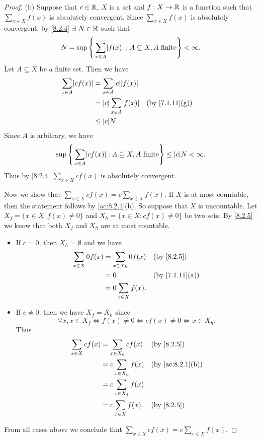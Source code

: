 \begin{proof}{(b)}
  Suppose that \(c \in \mathbb{R}\), \(X\) is a set and \(f : X \to \mathbb{R}\) is a function such that \(\sum_{x \in X} f(x)\) is absolutely convergent.
  Since \(\sum_{x \in X} f(x)\) is absolutely convergent, by \cref{8.2.4} \(\exists\ N \in \mathbb{R}\) such that
  \[
    N = \sup\Bigg\{\sum_{x \in A} \abs{f(x)} : A \subseteq X, A \text{ finite}\Bigg\} < \infty.
  \]
  Let \(A \subseteq X\) be a finite set.
  Then we have
  \begin{align*}
    \sum_{x \in A} \abs{cf(x)} & = \sum_{x \in A} \abs{c}\abs{f(x)}                                   \\
                               & = \abs{c}\sum_{x \in A} \abs{f(x)} &  & \text{(by \cref{7.1.11}(g))} \\
                               & \leq \abs{c} N.
  \end{align*}
  Since \(A\) is arbitrary, we have
  \[
    \sup\Bigg\{\sum_{x \in A} \abs{cf(x)} : A \subseteq X, A \text{ finite}\Bigg\} \leq \abs{c}N < \infty.
  \]
  Thus by \cref{8.2.4} \(\sum_{x \in X} cf(x)\) is absolutely convergent.

  Now we show that \(\sum_{x \in X} cf(x) = c \sum_{x \in X} f(x)\).
  If \(X\) is at most countable, then the statement follows by \cref{ac:8.2.1}(b).
  So suppose that \(X\) is uncountable.
  Let \(X_f = \{x \in X : f(x) \neq 0\}\) and \(X_h = \{x \in X : cf(x) \neq 0\}\) be two sets.
  By \cref{8.2.5} we know that both \(X_f\) and \(X_h\) are at most countable.
  \begin{itemize}
    \item If \(c = 0\), then \(X_h = \emptyset\) and we have
          \begin{align*}
            \sum_{x \in X} 0f(x) & = \sum_{x \in X_h} 0f(x) &  & \text{(by \cref{8.2.5})}     \\
                                 & = 0                      &  & \text{(by \cref{7.1.11}(a))} \\
                                 & = 0 \sum_{x \in X} f(x).
          \end{align*}
    \item If \(c \neq 0\), then we have \(X_f = X_h\) since
          \[
            \forall x, x \in X_f \iff f(x) \neq 0 \iff cf(x) \neq 0 \iff x \in X_h.
          \]
          Thus
          \begin{align*}
            \sum_{x \in X} cf(x) & = \sum_{x \in X_h} cf(x)  &  & \text{(by \cref{8.2.5})}       \\
                                 & = c \sum_{x \in X_h} f(x) &  & \text{(by \cref{ac:8.2.1}(b))} \\
                                 & = c \sum_{x \in X_f} f(x)                                     \\
                                 & = c \sum_{x \in X} f(x).  &  & \text{(by \cref{8.2.5})}
          \end{align*}
  \end{itemize}
  From all cases above we conclude that \(\sum_{x \in X} cf(x) = c \sum_{x \in X} f(x)\).
\end{proof}

